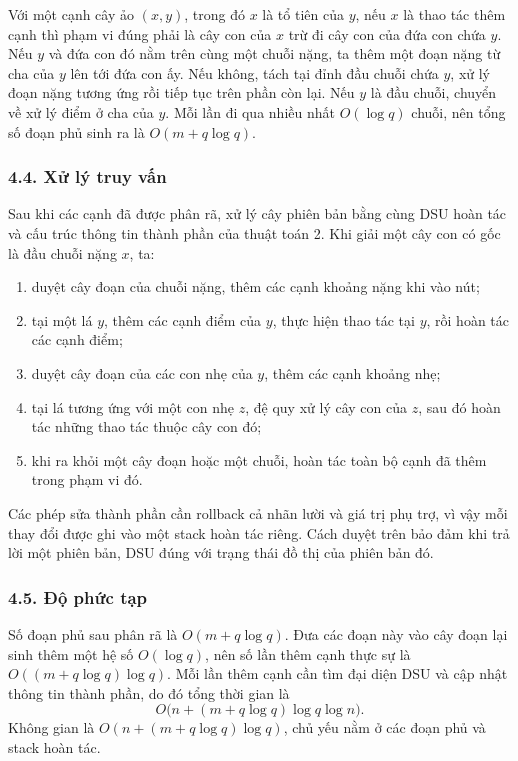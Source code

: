\documentclass[11pt]{article}
\begin{document}
Với một cạnh cây ảo \((x,y)\), trong đó \(x\) là tổ tiên của \(y\), nếu \(x\)
là thao tác thêm cạnh thì phạm vi đúng phải là cây con của \(x\) trừ đi cây con
của đứa con chứa \(y\). Nếu \(y\) và đứa con đó nằm trên cùng một chuỗi nặng,
ta thêm một đoạn nặng từ cha của \(y\) lên tới đứa con ấy. Nếu không, tách tại
đỉnh đầu chuỗi chứa \(y\), xử lý đoạn nặng tương ứng rồi tiếp tục trên phần còn
lại. Nếu \(y\) là đầu chuỗi, chuyển về xử lý điểm ở cha của \(y\). Mỗi lần đi
qua nhiều nhất \(O(\log q)\) chuỗi, nên tổng số đoạn phủ sinh ra là
\(O(m+q\log q)\).

\subsubsection*{4.4. Xử lý truy vấn}

Sau khi các cạnh đã được phân rã, xử lý cây phiên bản bằng cùng DSU hoàn tác và
cấu trúc thông tin thành phần của thuật toán 2. Khi giải một cây con có gốc là
đầu chuỗi nặng \(x\), ta:
\begin{enumerate}
  \item duyệt cây đoạn của chuỗi nặng, thêm các cạnh khoảng nặng khi vào nút;
  \item tại một lá \(y\), thêm các cạnh điểm của \(y\), thực hiện thao tác tại
  \(y\), rồi hoàn tác các cạnh điểm;
  \item duyệt cây đoạn của các con nhẹ của \(y\), thêm các cạnh khoảng nhẹ;
  \item tại lá tương ứng với một con nhẹ \(z\), đệ quy xử lý cây con của \(z\),
  sau đó hoàn tác những thao tác thuộc cây con đó;
  \item khi ra khỏi một cây đoạn hoặc một chuỗi, hoàn tác toàn bộ cạnh đã thêm
  trong phạm vi đó.
\end{enumerate}

Các phép sửa thành phần cần rollback cả nhãn lười và giá trị phụ trợ, vì vậy
mỗi thay đổi được ghi vào một stack hoàn tác riêng. Cách duyệt trên bảo đảm khi
trả lời một phiên bản, DSU đúng với trạng thái đồ thị của phiên bản đó.

\subsubsection*{4.5. Độ phức tạp}

Số đoạn phủ sau phân rã là \(O(m+q\log q)\). Đưa các đoạn này vào cây đoạn lại
sinh thêm một hệ số \(O(\log q)\), nên số lần thêm cạnh thực sự là
\(O((m+q\log q)\log q)\). Mỗi lần thêm cạnh cần tìm đại diện DSU và cập nhật
thông tin thành phần, do đó tổng thời gian là
\[
  O\bigl(n+(m+q\log q)\log q\log n\bigr).
\]
Không gian là \(O(n+(m+q\log q)\log q)\), chủ yếu nằm ở các đoạn phủ và stack
hoàn tác.
\end{document}
